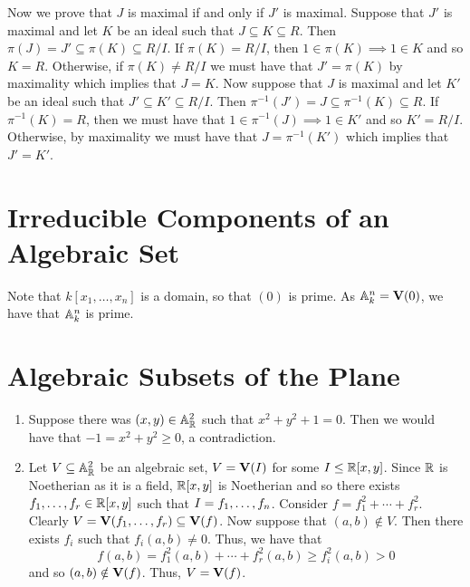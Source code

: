 \documentclass[letterpaper, 11pt, oneside]{book}
\begin{document}
\begin{sol}
\begin{enumerate}[label= (\alph*)]
          Now we prove that $J$ is maximal if and only if $J'$ is maximal.
          Suppose that $J'$ is maximal and let $K$ be an ideal such that $J \subseteq K \subseteq R$.
          Then $\pi(J) = J' \subseteq \pi(K) \subseteq R/I$.
          If $\pi(K) = R / I$, then $1 \in \pi(K) \implies 1 \in K$ and so $K = R$.
          Otherwise, if $\pi(K) \neq R / I$ we must have that $J' = \pi(K)$ by maximality which implies that $J = K$.
          Now suppose that $J$ is maximal and let $K'$ be an ideal such that $J' \subseteq K' \subseteq R/I$.
          Then $\pi^{-1}(J') = J \subseteq \pi^{-1}(K) \subseteq R$.
          If $\pi^{-1}(K) = R$, then we must have that $1 \in \pi^{-1}(J) \implies 1 \in K'$ and so $K' = R/I$.
          Otherwise, by maximality we must have that $J = \pi^{-1}(K')$ which implies that $J' = K'$.
  \end{enumerate}
\end{sol}

\clearpage

\section{Irreducible Components of an Algebraic Set}

\begin{sol}\label{ex:Curves_1.29}
  Note that $k[x_{1}, \ldots, x_{n}]$ is a domain, so that $(0)$ is prime.
  As $\mathbb{A}_{k}^{n} = \operatorname{\mathbf{V}}(0)$, we have that $\mathbb{A}_{k}^{n}$ is prime.
\end{sol}

\clearpage

\section{Algebraic Subsets of the Plane}

\begin{sol}\label{ex:Curves_1.30}
  \begin{enumerate}[label= (\alph*)]
    \item Suppose there was $(x, y) \in \mathbb{A}_{\mathbb{R}}^{2}$ such that $x^{2} + y^{2} + 1 = 0$.
          Then we would have that $-1 = x^{2} + y^{2} \geq 0$, a contradiction.
    \item Let $V \subseteq \mathbb{A}_{\mathbb{R}}^{2}$ be an algebraic set, $V = \operatorname{\mathbf{V}}(I)$ for some $I \leq \mathbb{R}[x, y]$.
          Since $\mathbb{R}$ is Noetherian as it is a field, $\mathbb{R}[x, y]$ is Noetherian and so there exists $f_{1}, \ldots, f_{r} \in \mathbb{R}[x, y]$ such that $I = \ideal{f_{1}, \ldots, f_{n}}$.
          Consider $f = f_{1}^{2} + \cdots + f_{r}^{2}$.
          Clearly $V = \operatorname{\mathbf{V}}(f_{1}, \ldots, f_{r}) \subseteq \operatorname{\mathbf{V}}(f)$.
          Now suppose that $(a, b) \notin V$.
          Then there exists $f_{i}$ such that $f_{i}(a, b) \neq 0$.
          Thus, we have that
          \[
            f(a, b) = f_{1}^{2}(a, b) + \cdots + f_{r}^{2}(a, b) \geq f_{i}^{2}(a, b) > 0
          \]
          and so $(a, b) \notin \operatorname{\mathbf{V}}(f)$.
          Thus, $V = \operatorname{\mathbf{V}}(f)$.
  \end{enumerate}
\end{sol}

\printbibliography
\end{document}
